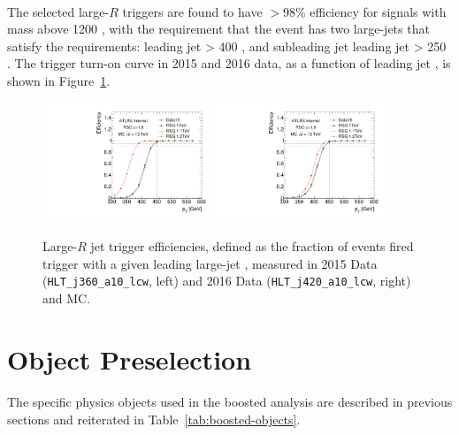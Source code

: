 \paragraph{}
The selected large-$R$ triggers are found to have $>98\%$ efficiency for signals with mass above 1200 \GeV, with the requirement that the event has two large-\R jets that satisfy the \pt requirements: leading jet \pt > 400 \GeV, and subleading jet leading jet \pt > 250 \GeV. The trigger turn-on curve in 2015 and 2016 data, as a function of leading jet \pt, is shown in Figure~\ref{fig:boosted-trigger-HLT-turnon}.
\begin{figure}[htbp!]
\begin{center}
  \includegraphics[width=0.45\textwidth,angle=-90]{figures/boosted/Trigger/trig_15_b77_pT_Efficiency.pdf}
  \includegraphics[width=0.45\textwidth,angle=-90]{figures/boosted/Trigger/trig_16_b77_pT_Efficiency.pdf}
  \caption{Large-$R$ jet trigger efficiencies, defined as the fraction of events fired trigger with a given leading large-\R jet \pt, measured in 2015 Data (\texttt{HLT\_j360\_a10\_lcw}, left) and 2016 Data (\texttt{HLT\_j420\_a10\_lcw}, right) and MC.}
  \label{fig:boosted-trigger-HLT-turnon}
\end{center}
\end{figure}

\section{Object Preselection}
\paragraph{}
The specific physics objects used in the boosted analysis are described in previous sections and reiterated in Table~\ref{tab:boosted-objects}.

